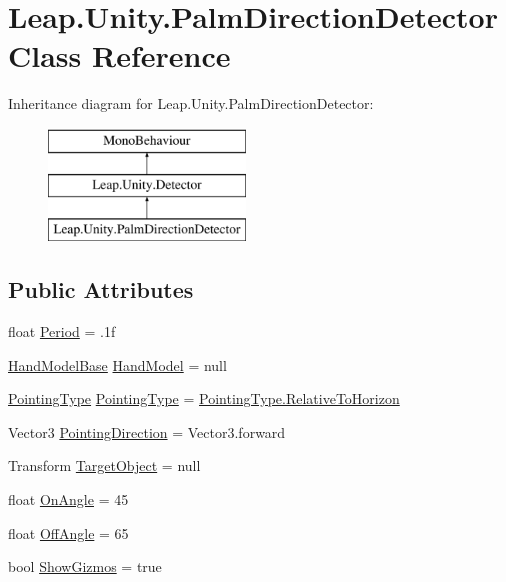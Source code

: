\hypertarget{class_leap_1_1_unity_1_1_palm_direction_detector}{}\section{Leap.\+Unity.\+Palm\+Direction\+Detector Class Reference}
\label{class_leap_1_1_unity_1_1_palm_direction_detector}
Inheritance diagram for Leap.\+Unity.\+Palm\+Direction\+Detector\+:\begin{figure}[H]
\begin{center}
\leavevmode
\includegraphics[height=3.000000cm]{class_leap_1_1_unity_1_1_palm_direction_detector}
\end{center}
\end{figure}
\subsection*{Public Attributes}
\begin{DoxyCompactItemize}
\item 
float \mbox{\hyperlink{class_leap_1_1_unity_1_1_palm_direction_detector_ab42f84878c8e2c9d4dcc49a55da4de08}{Period}} = .\+1f
\item 
\mbox{\hyperlink{class_leap_1_1_unity_1_1_hand_model_base}{Hand\+Model\+Base}} \mbox{\hyperlink{class_leap_1_1_unity_1_1_palm_direction_detector_a04242cdc1ffec25e90d17617ab694926}{Hand\+Model}} = null
\item 
\mbox{\hyperlink{namespace_leap_1_1_unity_a34b9e7741bfe47e7a9b1c2bffbe7f4cf}{Pointing\+Type}} \mbox{\hyperlink{class_leap_1_1_unity_1_1_palm_direction_detector_ad60756375755919c00a2601bb2642553}{Pointing\+Type}} = \mbox{\hyperlink{namespace_leap_1_1_unity_a34b9e7741bfe47e7a9b1c2bffbe7f4cfa31999ab3e9ca81aefc5d2bc9c075f580}{Pointing\+Type.\+Relative\+To\+Horizon}}
\item 
Vector3 \mbox{\hyperlink{class_leap_1_1_unity_1_1_palm_direction_detector_a32e39c8e66f81c384649dbf4b87a7601}{Pointing\+Direction}} = Vector3.\+forward
\item 
Transform \mbox{\hyperlink{class_leap_1_1_unity_1_1_palm_direction_detector_adbf98d8c7989d572784c00c28cd4cf97}{Target\+Object}} = null
\item 
float \mbox{\hyperlink{class_leap_1_1_unity_1_1_palm_direction_detector_aecf3d9f415408c7ea4fe2f2df0b39d6a}{On\+Angle}} = 45
\item 
float \mbox{\hyperlink{class_leap_1_1_unity_1_1_palm_direction_detector_ab04effce60950f3e1cc50d13507871b3}{Off\+Angle}} = 65
\item 
bool \mbox{\hyperlink{class_leap_1_1_unity_1_1_palm_direction_detector_a138b25d96be20bfb150f7cfadfaee8bf}{Show\+Gizmos}} = true
\end{DoxyCompactItemize}
